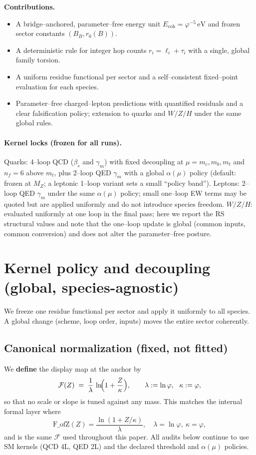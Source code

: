 \documentclass[epjc3]{svjour3}
\begin{document}
\medskip
\noindent\textbf{Contributions.}
\begin{itemize}
  \item A bridge–anchored, parameter–free energy unit $E_{\mathrm{coh}}=\varphi^{-5}\,\mathrm{eV}$ and frozen sector constants $(B_B,r_0(B))$.
  \item A deterministic rule for integer hop counts $r_i=\ell_i+\tau_i$ with a single, global family torsion.
  \item A uniform residue functional per sector and a self–consistent fixed–point evaluation for each species.
  \item Parameter–free charged–lepton predictions with quantified residuals and a clear falsification policy; extension to quarks and $W/Z/H$ under the same global rules.
\end{itemize}

\medskip
\paragraph{Kernel locks (frozen for all runs).}
Quarks: 4--loop QCD ($\beta_s$ and $\gamma_m$) with fixed decoupling at $\mu=m_c,m_b,m_t$ and $n_f=6$ above $m_t$, plus 2--loop QED $\gamma_m$ with a global $\alpha(\mu)$ policy (default: frozen at $M_Z$; a leptonic 1--loop variant sets a small ``policy band''). Leptons: 2--loop QED $\gamma_m$ under the same $\alpha(\mu)$ policy; small one--loop EW terms may be quoted but are applied uniformly and do not introduce species freedom. $W/Z/H$: evaluated uniformly at one loop in the final pass; here we report the RS structural values and note that the one--loop update is global (common inputs, common conversion) and does not alter the parameter--free posture.

\section*{Kernel policy and decoupling (global, species-agnostic)}
We freeze one residue functional per sector and apply it uniformly to all species. A global change (scheme, loop order, inputs) moves the entire sector coherently.


\subsection*{Canonical normalization (fixed, not fitted)}
We \textbf{define} the display map at the anchor by
\[
\mathcal F(Z)\;=\;\frac{1}{\lambda}\,\ln\!\Bigl(1+\frac{Z}{\kappa}\Bigr),
\qquad
\lambda:=\ln\varphi,\ \ \kappa:=\varphi,
\]
so that no scale or slope is tuned against any mass. This matches the internal formal layer where
\[
\mathrm{F\_ofZ}(Z)=\frac{\ln(1+Z/\kappa)}{\lambda},\quad
\lambda=\ln\varphi,\ \kappa=\varphi,
\]
and is the same $\mathcal F$ used throughout this paper. All audits below continue to use SM kernels (QCD 4L, QED 2L) and the declared threshold and $\alpha(\mu)$ policies.
\end{document}
